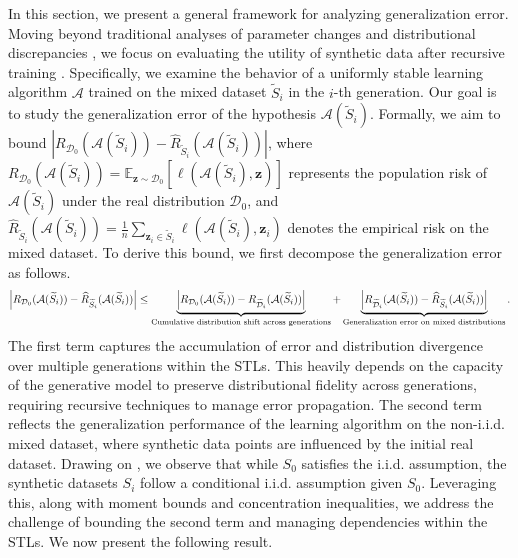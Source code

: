 In this section, we present a general framework for analyzing generalization error. Moving beyond traditional analyses of parameter changes \citep{bertrandstability} and distributional discrepancies \citep{futowards}, we focus on evaluating the utility of synthetic data after recursive training \citep{hittmeir2019utility,xu2023utility}. Specifically, we examine the behavior of a uniformly stable learning algorithm $\mathcal{A}$ trained on the mixed dataset $\widetilde{S}_i$ in the $i$-th generation. Our goal is to study the generalization error of the hypothesis $\mathcal{A}(\widetilde{S}_i)$. Formally, we aim to bound $|R_{\mathcal{D}_0}(\mathcal{A}(\widetilde{S}_i)) - \widehat{R}_{\widetilde{S}_i}(\mathcal{A}(\widetilde{S}_i))|$, where $R_{\mathcal{D}_0}(\mathcal{A}(\widetilde{S}_i)) = \mathbb{E}_{\boldsymbol{z} \sim \mathcal{D}_0}[\ell(\mathcal{A}(\widetilde{S}_i), \boldsymbol{z})]$ represents the population risk of $\mathcal{A}(\widetilde{S}_{i})$ under the real distribution $\mathcal{D}_0$, and $\widehat{R}_{\widetilde{S}_i}(\mathcal{A}(\widetilde{S}_i)) = \frac{1}{n} \sum_{\boldsymbol{z}_i \in \widetilde{S}_i} \ell(\mathcal{A}(\widetilde{S}_i), \boldsymbol{z}_i)$ denotes the empirical risk on the mixed dataset. To derive this bound, we first decompose the generalization error as follows.
\begin{align}
\left|R_{\mathcal{D}_0}(\mathcal{A}(\widetilde{S}_i))-\widehat{R}_{\widetilde{S}_i}(\mathcal{A}(\widetilde{S}_i))\right| \leq \underbrace{\left|R_{\mathcal{D}_0}(\mathcal{A}(\widetilde{S}_i))-R_{\widetilde{\mathcal{D}}_i}(\mathcal{A}(\widetilde{S}_i))\right|}_{\text {Cumulative distribution shift across generations}}+\underbrace{\left| R_{\widetilde{\mathcal{D}}_i}(\mathcal{A}(\widetilde{S}_i))-\widehat{R}_{\widetilde{S}_i}(\mathcal{A}(\widetilde{S}_i)) \right|}_{\text {Generalization error on mixed distributions}}. \notag
\end{align}
The first term captures the accumulation of error and distribution divergence over multiple generations within the STLs. This heavily depends on the capacity of the generative model to preserve distributional fidelity across generations, requiring recursive techniques to manage error propagation. The second term reflects the generalization performance of the learning algorithm on the non-i.i.d. mixed dataset, where synthetic data points are influenced by the initial real dataset. Drawing on \cite{zheng2023toward}, we observe that while $S_0$ satisfies the i.i.d. assumption, the synthetic datasets $S_i$ follow a conditional i.i.d. assumption given $S_0$. Leveraging this, along with moment bounds and concentration inequalities, we address the challenge of bounding the second term and managing dependencies within the STLs. We now present the following result.
